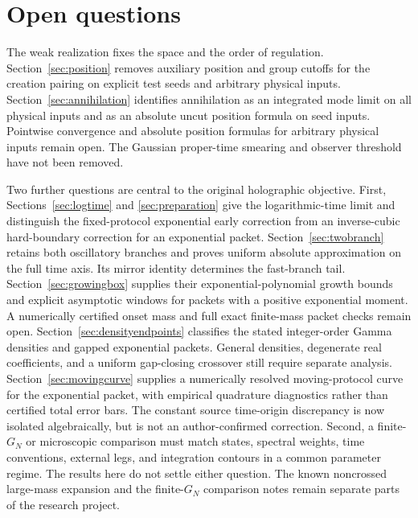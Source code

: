 \documentclass[11pt,a4paper]{article}
\numberwithin{equation}{section}
\theoremstyle{definition}
\theoremstyle{remark}
\begin{document}
\tableofcontents

















\section{Open questions}
The weak realization fixes the space and the order of regulation.
Section~\ref{sec:position} removes auxiliary position and group cutoffs
for the creation pairing on explicit test seeds and arbitrary physical
inputs. Section~\ref{sec:annihilation} identifies annihilation as an
integrated mode limit on all physical inputs and as an absolute uncut
position formula on seed inputs. Pointwise convergence and absolute
position formulas for arbitrary physical inputs remain open. The Gaussian
proper-time smearing and observer threshold have not been removed.

Two further questions are central to the original holographic objective.
First, Sections~\ref{sec:logtime} and \ref{sec:preparation} give the
logarithmic-time limit and distinguish the fixed-protocol exponential
early correction from an inverse-cubic hard-boundary correction for an
exponential packet.
Section~\ref{sec:twobranch} retains both oscillatory branches and
proves uniform absolute approximation on the full time axis. Its
mirror identity determines the fast-branch tail.
Section~\ref{sec:growingbox} supplies their exponential-polynomial
growth bounds and explicit asymptotic windows for packets with a
positive exponential moment. A numerically certified onset mass and
full exact finite-mass packet checks remain open.
Section~\ref{sec:densityendpoints} classifies the stated integer-order
Gamma densities and gapped exponential packets. General densities,
degenerate real coefficients, and a uniform gap-closing crossover still
require separate analysis. Section~\ref{sec:movingcurve} supplies a numerically
resolved moving-protocol curve for the exponential packet, with empirical
quadrature diagnostics rather than certified total error bars.
The constant source
time-origin discrepancy is now isolated algebraically, but is not an
author-confirmed correction.
Second, a finite-$G_N$ or microscopic comparison must
match states, spectral weights, time conventions, external legs, and
integration contours in a common parameter regime. The results here do not
settle either question. The known noncrossed large-mass expansion and the
finite-$G_N$ comparison notes remain separate parts of the research project.

\appendix



\end{document}
